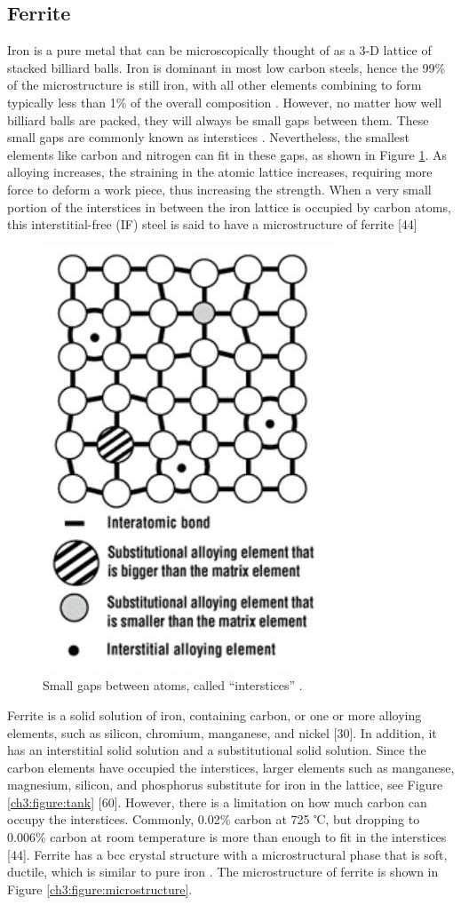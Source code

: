 \documentclass[12pt]{report}
\begin{document}
\subsection{Ferrite} 
Iron is a pure metal that can be microscopically thought of as a 3-D lattice of stacked billiard balls. Iron is dominant in most low carbon steels, hence the 99\% of the microstructure is still iron, with all other elements combining to form typically less than 1\% of the overall composition \cite{bajaj2020steels}. However, no matter how well billiard balls are packed, they will always be small gaps between them. These small gaps are commonly known as interstices \cite{bajaj2020steels}. Nevertheless, the smallest elements like carbon and nitrogen can fit in these gaps, as shown in Figure \ref{ch3:figure:gaps}. As alloying increases, the straining in the atomic lattice increases, requiring more force to deform a work piece, thus increasing the strength. When a very small portion of the interstices in between the iron lattice is occupied by carbon atoms, this interstitial-free (IF) steel is said to have a microstructure of ferrite [44]
 
\begin{figure}[H]
    \centering
    \includegraphics[width=.5\textwidth]{small_gaps_between_atoms.jpg}
    \caption{Small gaps between atoms, called “interstices” \cite{bajaj2020steels}.}
    \label{ch3:figure:gaps}
\end{figure}

Ferrite is a solid solution of iron, containing carbon, or one or more alloying elements, such as silicon, chromium, manganese, and nickel [30]. In addition, it has an interstitial solid solution and a substitutional solid solution. Since the carbon elements have occupied the interstices, larger elements such as manganese, magnesium, silicon, and phosphorus substitute for iron in the lattice, see Figure \ref{ch3:figure:tank} [60]. However, there is a limitation on how much carbon can occupy the interstices. Commonly, 0.02\% carbon at 725 ℃, but dropping to 0.006\% carbon at room temperature is more than enough to fit in the interstices [44]. Ferrite has a bcc crystal structure with a microstructural phase that is soft, ductile, which is similar to pure iron \cite{bajaj2020steels}. The microstructure of ferrite is shown in Figure \ref{ch3:figure:microstructure}.
\end{document}
